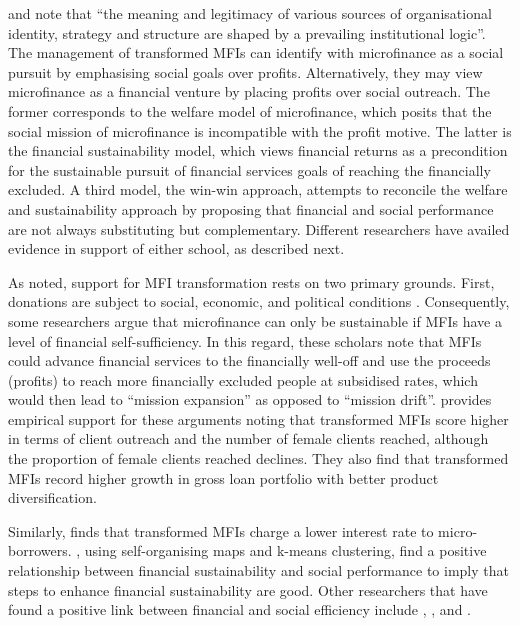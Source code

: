 \documentclass[a4paper,nobind]{templates/ociamthesis}
\begin{document}
\textcite{thornton2002rise} and \textcite{thornton2015institutional} note that ``the meaning and legitimacy of various sources of organisational identity, strategy and structure are shaped by a prevailing institutional logic''. The management of transformed MFIs can identify with microfinance as a social pursuit by emphasising social goals over profits. Alternatively, they may view microfinance as a financial venture by placing profits over social outreach. The former corresponds to the welfare model of microfinance, which posits that the social mission of microfinance is incompatible with the profit motive. The latter is the financial sustainability model, which views financial returns as a precondition for the sustainable pursuit of financial services goals of reaching the financially excluded. A third model, the win-win approach, attempts to reconcile the welfare and sustainability approach by proposing that financial and social performance are not always substituting but complementary. Different researchers have availed evidence in support of either school, as described next.

As noted, support for MFI transformation rests on two primary grounds. First, donations are subject to social, economic, and political conditions \autocite{garmaise2013cheap,armendariz2013subsidy,d2017aid}. Consequently, some researchers argue that microfinance can only be sustainable if MFIs have a level of financial self-sufficiency. In this regard, these scholars note that MFIs could advance financial services to the financially well-off and use the proceeds (profits) to reach more financially excluded people at subsidised rates, which would then lead to ``mission expansion'' as opposed to ``mission drift''. \textcite{frank2008stemming} provides empirical support for these arguments noting that transformed MFIs score higher in terms of client outreach and the number of female clients reached, although the proportion of female clients reached declines. They also find that transformed MFIs record higher growth in gross loan portfolio with better product diversification.

Similarly, \textcite{d2017ngos} finds that transformed MFIs charge a lower interest rate to micro-borrowers. \textcite{louis2013financial}, using self-organising maps and k-means clustering, find a positive relationship between financial sustainability and social performance to imply that steps to enhance financial sustainability are good. Other researchers that have found a positive link between financial and social efficiency include \textcite{gutierrez2009social}, \textcite{mersland2010microfinance}, and \textcite{quayes2012depth}.
\end{document}
